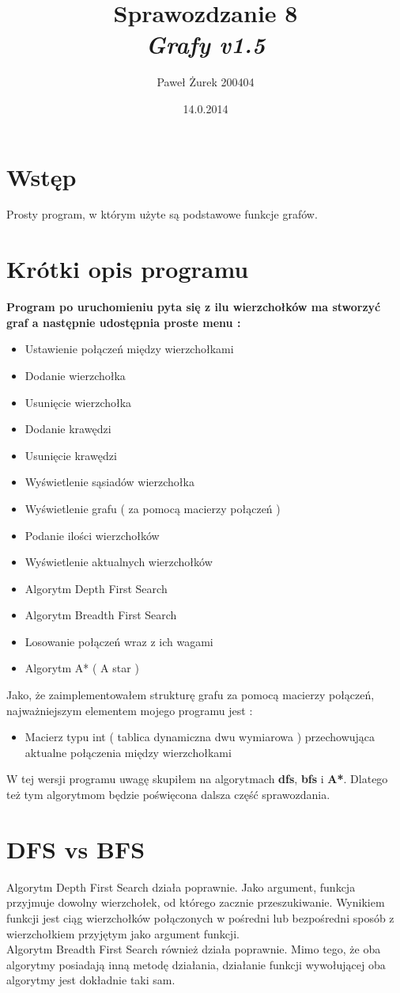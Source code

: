 \documentclass[10 pt]{article}
\title{Sprawozdzanie 8 \\ \emph{\textbf{Grafy v1.5}}}
\author{Paweł Żurek 200404}
\date{14.0.2014}
\begin{document}
\tableofcontents
\maketitle
\section{Wstęp}
Prosty program, w którym użyte są podstawowe funkcje grafów.
\section{Krótki opis programu}
\textbf{Program po uruchomieniu pyta się z ilu wierzchołków ma stworzyć graf a następnie udostępnia proste menu : }
\begin{itemize}
\item Ustawienie połączeń między wierzchołkami
\item Dodanie wierzchołka
\item Usunięcie wierzchołka
\item Dodanie krawędzi
\item Usunięcie krawędzi
\item Wyświetlenie sąsiadów wierzchołka
\item Wyświetlenie grafu ( za pomocą macierzy połączeń )
\item Podanie ilości wierzchołków
\item Wyświetlenie aktualnych wierzchołków
\item Algorytm Depth First Search
\item Algorytm Breadth First Search
\item Losowanie połączeń wraz z ich wagami
\item Algorytm A* ( A star )
\end{itemize}
Jako, że zaimplementowałem strukturę grafu za pomocą macierzy połączeń, najważniejszym elementem mojego programu jest : 
\begin{itemize}
\item Macierz typu int ( tablica dynamiczna dwu wymiarowa ) przechowująca aktualne połączenia między wierzchołkami
\end{itemize}
W tej wersji programu uwagę skupiłem na algorytmach \textbf{dfs}, \textbf{bfs} i \textbf{A*}. Dlatego też tym algorytmom będzie poświęcona dalsza część sprawozdania.

\section{\textbf{DFS} vs \textbf{BFS}}
Algorytm Depth First Search działa poprawnie. Jako argument, funkcja przyjmuje dowolny wierzchołek, od którego zacznie przeszukiwanie. Wynikiem funkcji jest ciąg wierzchołków połączonych w pośredni lub bezpośredni sposób z wierzchołkiem przyjętym jako argument funkcji.
\\
Algorytm Breadth First Search również działa poprawnie. Mimo tego, że oba algorytmy posiadają inną metodę działania, działanie funkcji wywołującej oba algorytmy jest dokładnie taki sam.
\end{document}
